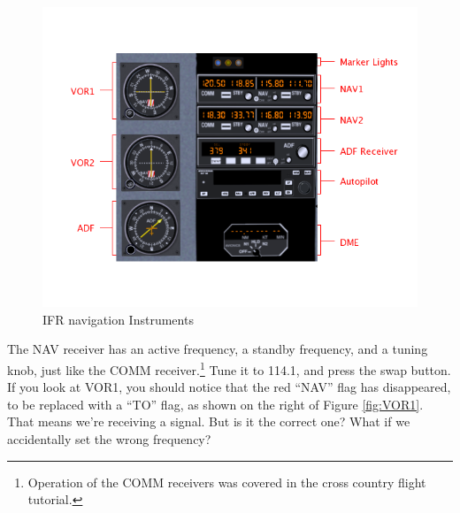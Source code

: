 \begin{figure}
  \begin{center}
    \includegraphics[width=12cm]{img/panel_labelled}
    \caption{IFR navigation Instruments}
    \label{fig:panel}
  \end{center}
\end{figure}

The NAV receiver has an active frequency, a standby frequency, and a
tuning knob, just like the COMM receiver.\footnote{Operation of the
  COMM receivers was covered in the cross country flight tutorial.}
Tune it to 114.1, and press the swap button.  If you look at VOR1, you should notice that the red ``NAV''
flag has disappeared, to be replaced with a ``TO'' flag, as shown on
the right of Figure \ref{fig:VOR1}.  That means we're receiving a
signal.  But is it the correct one?  What if we accidentally set the
wrong frequency?

